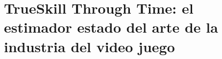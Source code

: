 \documentclass[a4paper,10pt]{book}
\theoremstyle{definition}
\begin{document}
\chapter{TrueSkill Through Time: el estimador estado del arte de la industria del video juego}
\end{document}
